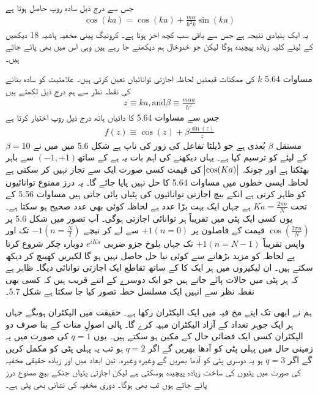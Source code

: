 جس سے درج ذیل سادہ روپ حاصل ہوتا ہے
\begin{align}
	\cos(ka) = \cos(ka) + \frac{m\alpha}{\hbar^{2}k}\sin(ka)
\end{align}
یہ ایک بنیادی نتیجہ ہے جس سے باقی سب کچھ اخز ہوتا ہے۔ کرونیگ پینی مخفیہ ہاشیہ \num{18} دیکھیں کے لیئے کلیہ زیادہ پیچیدہ ہوگا لیکن جو خدوخال ہم دیکھنے جا رہے ہیں وہی اس میں بھی پائے جاتے ہیں۔

 مساوات \num{5.64} $k$ کی ممکنات قیمتیں لحاظہ اجازتی توانائیاں تعین کرتی ہیں۔ علامتیت کو سادہ بنانے کی نقطہ نظر سے ہم درج ذیل لکھتے ہیں 
\begin{align}
	z \equiv ka, \text{and} \beta \equiv \frac{m\alpha a}{\hbar^{2}}
\end{align}
جس سے مساوات \num{5.64} کا دائیاں ہاتھ درج ذیل روپ اختیار کرتا ہے
\begin{align}
	f(z) \equiv \cos(z) + \beta\frac{\sin(z)}{z}
\end{align}
مستقل $\beta$ بُعدی ہے جو ڈیلٹا تفاعل کی زور کی ناپ ہے شکل \num{5.6} میں میں نے \(\beta = 10\) کے لیئے  کو ترسیم کیا ہے۔ یہاں دیکھنے کی اہم بات یہ ہے کے ساتھ\((-1, +1)\) سے باہر بھٹکتا ہے اور چونکہ \(\abs{\cos(Ka)}\) کی قیمت کسی صورت ایک سے تجاز نہیں کر سکتی ہے لحاظہ ایسی خطوں میں مساوات \num{5.64} کا حل نہیں پایا جائے گا۔ یہ درز ممنوع توانائیوں کو ظاہر کرتی ہے انکے بیچ اجازتی توانائیوں کی پٹیاں پائی جاتی ہیں مساوات \num{5.56} کے تحت \(Ka = \frac{2\pi n}{N}\) ہے جہاں  ایک بہت بڑا عدد ہے لحاظہ  کوئی بھی عدد صحیح ہو سکتا ہے۔ یوں کسی ایک پٹی میں تقریباً ہر توانائی اجازتی ہوگی۔ آپ تصور میں شکل \num{5.6} پر \(\cos(\frac{2\pi n}{N})\) قیمت کے فاصلون پر \(+1(n = 0)\) سے لے کر نیچے \(-1(n = \frac{N}{2})\) تک اور واپس تقریباً \(+1(n = N-1)\) تک جہاں بلوخ جزو ضربی \(e^{iKa}\) دوبارہ چکر شروع کرتا پے لحاظہ  کو مزید بڑھانے سے کوئی نیا حل حاصل نہیں ہو گا لکیریں کھینچ کر دیکھ سکتے ہیں۔ ان لیکیروں میں ہر ایک کا  کے ساتھ تقاطع ایک اجازتی توانائی دیگا۔ ظاہر ہے کہ ہر پٹی میں  حالات پائے جاتے ہیں جو ایک دوسرے کے اتنے قریب ہیں  کہ کسی بھی نقطہ نظر سے انہیں ایک مسلسل خطہ تصور کیا جا سکتا ہے شکل \num{5.7}۔

 ہم نے ابھی تک اپنے مخ فیہ میں ایک الیکٹران رکھا ہے۔ حقیقت میں  الیکٹران ہوںگے جہاں ہر ایک جوہر  تعداد کے آزاد الیکٹران مہیہ کرے گا۔ پالی اصولِ منات کے بنا صرف دو الیکٹران کسی ایک فضائی حال کے مکین ہو سکتے ہیں۔ یوں  \(q = 1\) کی صورت میں یہ زمینی حال میں پہلی پٹی کو آدھا  بھریں گے اگر  \(q = 2\) ہو تب یہ پہلی پٹی کو مکمل کریں گے اگر \(q = 3\) ہو یہ دوسری پٹی کو آدھا بھریں گے وغیرہ وغیرہ. تین ابعاد میں اور زیادہ حقیقی مخفیہ کی صورت میں پٹیوں کی ساخت زیادہ پیچیدہ ہوسکتی ہے لیکن اجازتی پٹیاں جنکے بیچ ممنوع درز پائے جاتے ہوں تب بھی ہوگا۔ دوری مخفیہ کی نشانی بھی پٹی ہے۔
 
